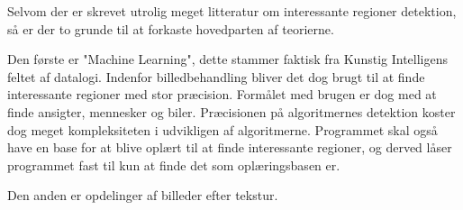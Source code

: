 {Selvom der er skrevet utrolig meget litteratur om interessante regioner
detektion, så er der to grunde til at forkaste hovedparten af teorierne.

Den første er "Machine Learning", dette stammer faktisk fra Kunstig
Intelligens feltet af datalogi. Indenfor billedbehandling bliver det dog
brugt til at finde interessante regioner med stor præcision. Formålet
med brugen er dog med at finde ansigter, mennesker og
biler\cite{ViolaJones01}\cite{PapageorgiouPoggio}. Præcisionen på
algoritmernes detektion koster dog meget kompleksiteten i udvikligen 
af algoritmerne. Programmet skal også have en base for at blive oplært
til at finde interessante regioner, og derved låser programmet fast til
kun at finde det som oplæringsbasen er.

Den anden er opdelinger af billeder efter tekstur.



%
%



}
